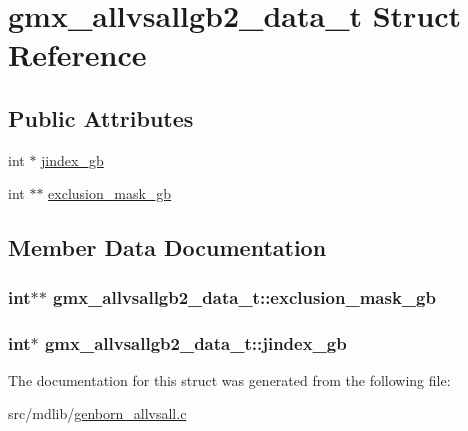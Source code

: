 \hypertarget{structgmx__allvsallgb2__data__t}{\section{gmx\-\_\-allvsallgb2\-\_\-data\-\_\-t \-Struct \-Reference}
\label{structgmx__allvsallgb2__data__t}
}
\subsection*{\-Public \-Attributes}
\begin{DoxyCompactItemize}
\item 
int $\ast$ \hyperlink{structgmx__allvsallgb2__data__t_a8ea8747e344e996ddf319e60283004c9}{jindex\-\_\-gb}
\item 
int $\ast$$\ast$ \hyperlink{structgmx__allvsallgb2__data__t_aca1feba92c022f4a2f9ff231a0945f4d}{exclusion\-\_\-mask\-\_\-gb}
\end{DoxyCompactItemize}


\subsection{\-Member \-Data \-Documentation}
\hypertarget{structgmx__allvsallgb2__data__t_aca1feba92c022f4a2f9ff231a0945f4d}{
\subsubsection[{exclusion\-\_\-mask\-\_\-gb}]{\setlength{\rightskip}{0pt plus 5cm}int$\ast$$\ast$ {\bf gmx\-\_\-allvsallgb2\-\_\-data\-\_\-t\-::exclusion\-\_\-mask\-\_\-gb}}}\label{structgmx__allvsallgb2__data__t_aca1feba92c022f4a2f9ff231a0945f4d}
\hypertarget{structgmx__allvsallgb2__data__t_a8ea8747e344e996ddf319e60283004c9}{
\subsubsection[{jindex\-\_\-gb}]{\setlength{\rightskip}{0pt plus 5cm}int$\ast$ {\bf gmx\-\_\-allvsallgb2\-\_\-data\-\_\-t\-::jindex\-\_\-gb}}}\label{structgmx__allvsallgb2__data__t_a8ea8747e344e996ddf319e60283004c9}


\-The documentation for this struct was generated from the following file\-:\begin{DoxyCompactItemize}
\item 
src/mdlib/\hyperlink{genborn__allvsall_8c}{genborn\-\_\-allvsall.\-c}\end{DoxyCompactItemize}
